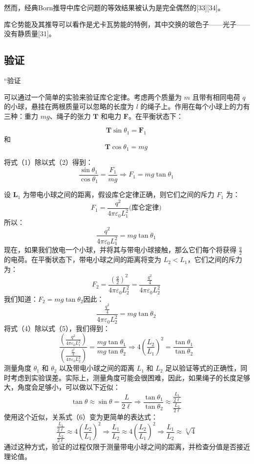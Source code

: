 然而，经典Born推导中库仑问题的等效结果被认为是完全偶然的[33][34]。

库仑势能及其推导可以看作是尤卡瓦势能的特例，其中交换的玻色子——光子——没有静质量[31]。
\subsection{验证}
“验证

可以通过一个简单的实验来验证库仑定律。考虑两个质量为 \( m \) 且带有相同电荷 \( q \) 的小球，悬挂在两根质量可以忽略的长度为 \( l \) 的绳子上。作用在每个小球上的力有三种：重力 \( mg \)、绳子的张力 \( \mathbf{T} \) 和电力 \( \mathbf{F} \)。在平衡状态下：

\[
\mathbf{T} \sin \theta_1 = \mathbf{F}_1 \tag{1}~
\]
和
\[
\mathbf{T} \cos \theta_1 = mg \tag{2}~
\]

将式（1）除以式（2）得到：
\[
\frac{\sin \theta_1}{\cos \theta_1} = \frac{F_1}{mg} \Rightarrow F_1 = mg \tan \theta_1 \tag{3}~
\]

设 \( \mathbf{L}_1 \) 为带电小球之间的距离，假设库仑定律正确，则它们之间的斥力 \( F_1 \) 为：
\[
F_1 = \frac{q^2}{4 \pi \varepsilon_0 L_1^2}\text{(库仑定律)}~ 
\]
所以：
\[
\frac{q^2}{4\pi \varepsilon_0 L_1^2} = mg \tan \theta_1 \tag{4}~
\]
现在，如果我们放电一个小球，并将其与带电小球接触，那么它们每个将获得 \( \frac{q}{2} \) 的电荷。在平衡状态下，带电小球之间的距离将变为 \( L_2 < L_1 \)，它们之间的斥力为：
\[
F_2 = \frac{\left( \frac{q}{2} \right)^2}{4 \pi \varepsilon_0 L_2^2} = \frac{\frac{q^2}{4}}{4 \pi \varepsilon_0 L_2^2} \tag{5}~
\]
我们知道：\(F_2 = mg \tan \theta_2\)因此：
\[
\frac{\frac{q^2}{4}}{4 \pi \varepsilon_0 L_2^2} = mg \tan \theta_2~
\]
将式（4）除以式（5），我们得到：
\[
\frac{\left( \frac{q^2}{4 \pi \varepsilon_0 L_1^2} \right)}{\left( \frac{\frac{q^2}{4}}{4 \pi \varepsilon_0 L_2^2} \right)} = \frac{mg \tan \theta_1}{mg \tan \theta_2} \Rightarrow 4 \left( \frac{L_2}{L_1} \right)^2 = \frac{\tan \theta_1}{\tan \theta_2} \tag{6}~
\] 
测量角度 \( \theta_1 \) 和 \( \theta_2 \) 以及带电小球之间的距离 \( L_1 \) 和 \( L_2 \) 足以验证等式的正确性，同时考虑到实验误差。实际上，测量角度可能会很困难，因此，如果绳子的长度足够大，角度会足够小，可以做以下近似：
\[
\tan \theta \approx \sin \theta = \frac{L}{2\ell} \Rightarrow \frac{\tan \theta_1}{\tan \theta_2} \approx \frac{\frac{L_1}{2\ell}}{\frac{L_2}{2\ell}} \tag{7}~
\]
使用这个近似，关系式（6）变为更简单的表达式：
\[
\frac{\frac{L_1}{2\ell}}{\frac{L_2}{2\ell}} \approx 4 \left( \frac{L_2}{L_1} \right)^2 \Rightarrow \frac{L_1}{L_2} \approx 4 \left( \frac{L_2}{L_1} \right)^2 \Rightarrow \frac{L_1}{L_2} \approx \sqrt[3]{4} \tag{8}~
\]
通过这种方式，验证的过程仅限于测量带电小球之间的距离，并检查分值是否接近理论值。 

